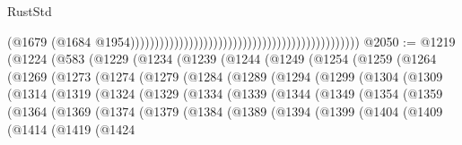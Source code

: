\begin{lexlean}{RustStd}
\begin{coremodule}
                                                                                              (@1679
                                                                                                (@1684
                                                                                                  @1954)))))))))))))))))))))))))))))))))))))))))))))))
@2050 := @1219
    (@1224
      (@583
        (@1229
          (@1234
            (@1239
              (@1244
                (@1249
                  (@1254
                    (@1259
                      (@1264
                        (@1269
                          (@1273
                            (@1274
                              (@1279
                                (@1284
                                  (@1289
                                    (@1294
                                      (@1299
                                        (@1304
                                          (@1309
                                            (@1314
                                              (@1319
                                                (@1324
                                                  (@1329
                                                    (@1334
                                                      (@1339
                                                        (@1344
                                                          (@1349
                                                            (@1354
                                                              (@1359
                                                                (@1364
                                                                  (@1369
                                                                    (@1374
                                                                      (@1379
                                                                        (@1384
                                                                          (@1389
                                                                            (@1394
                                                                              (@1399
                                                                                (@1404
                                                                                  (@1409
                                                                                    (@1414
                                                                                      (@1419
                                                                                        (@1424

\end{coremodule}
\end{lexlean}
